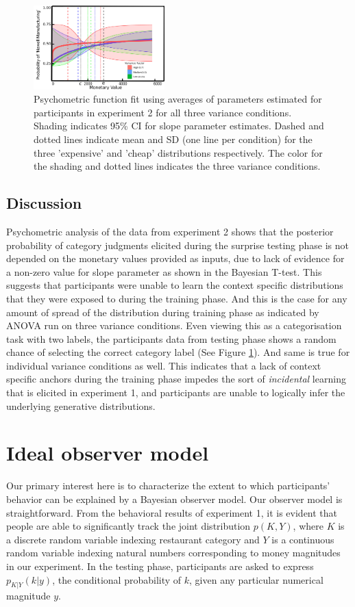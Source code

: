 \documentclass[10pt,letterpaper]{article}
\begin{document}
\begin{figure}[h!]
    \centering
    \includegraphics[width=0.45\textwidth]{results/slope_CS.pdf}
    \caption{Psychometric function fit using averages of parameters estimated for participants in experiment 2 for all three variance conditions. Shading indicates 95\% CI for slope parameter estimates. Dashed and dotted lines indicate mean and SD (one line per condition) for the three 'expensive' and 'cheap' distributions respectively. The color for the shading and dotted lines indicates the three variance conditions.}
    \label{fig:my_label2}
\end{figure}

\subsection{Discussion}
Psychometric analysis of the data from experiment 2 shows that the posterior probability of category judgments elicited during the surprise testing phase is not depended on the monetary values provided as inputs, due to lack of evidence for a non-zero value for slope parameter as shown in the Bayesian T-test. This 
suggests that participants were unable to learn the context specific distributions that they were exposed to during the training phase. And this is the case for any amount of spread of the distribution during training phase as indicated by ANOVA run on three variance conditions. Even viewing this as a categorisation task with two labels, the participants data from testing phase shows a random chance of selecting the correct category label (See Figure \ref{fig:my_label2}). And same is true for individual variance conditions as well.
This indicates that a lack of context specific anchors during the training phase impedes the sort of {\em incidental} learning that is elicited in experiment 1, and participants are unable to logically infer the underlying generative distributions.



\section{Ideal observer model}
Our primary interest here is to characterize the extent to which participants' behavior can be explained by a Bayesian observer model. Our observer model is straightforward. From the behavioral results of experiment 1, it is evident that people are able to significantly track the joint distribution $p(K,Y)$, where $K$ is a discrete random variable indexing restaurant category and $Y$ is a continuous random variable indexing natural numbers corresponding to money magnitudes in our experiment. In the testing phase, participants are asked to express $p_{K|Y}(k|y)$, the conditional probability of $k$, given any particular numerical magnitude $y$.  
\end{document}
